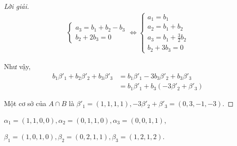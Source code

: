 \begin{proof}[Lời giải]
\begin{align*}
\begin{cases}
                                  a_{3} = b_{1} + b_{2} - b_{3} \\
                                  b_{2} + 2b_{3} = 0
                              \end{cases}
        \Longleftrightarrow
        \begin{cases}
            a_{1} = b_{1}                    \\
            a_{2} = b_{1} + b_{2}            \\
            a_{3} = b_{1} + \frac{3}{2}b_{2} \\
            b_{2} + 3b_{3} = 0
        \end{cases}
    \end{align*}
    
    Như vậy,
    \begin{align*}
        b_{1}\beta'_{1} + b_{2}\beta'_{2} + b_{3}\beta'_{3}
         & = b_{1}\beta'_{1} - 3b_{3}\beta'_{2} + b_{3}\beta'_{3} \\
         & = b_{1}\beta'_{1} + b_{3}(-3\beta'_{2} + \beta'_{3})
    \end{align*}
    
    Một cơ sở của $A\cap B$ là $\beta'_{1} = (1,1,1,1), -3\beta'_{2} + \beta'_{3} = (0, 3, -1, -3)$.
\end{proof}

\begin{exercise}
    $\alpha_{1} = (1,1,0,0), \alpha_{2} = (0,1,1,0), \alpha_{3} = (0,0,1,1)$,
    
    $\beta_{1} = (1,0,1,0), \beta_{2} = (0,2,1,1), \beta_{3} = (1,2,1,2)$.
\end{exercise}

